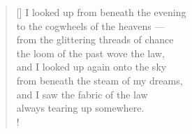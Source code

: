 \documentclass[a4paper,12pt,twoside,final]{book}
\begin{document}

\settowidth{\versewidth}{from under the steam of my dreams,}

\begin{verse}[\versewidth]
  I looked up from beneath the evening \\
  to the cogwheels of the heavens --- \\
  from the glittering threads of chance \\
  the loom of the past wove the law, \\
  and I looked up again onto the sky \\
  from beneath the steam of my dreams, \\
  and I saw the fabric of the law \\
  always tearing up somewhere. \\!
\end{verse}


\newpage

\settowidth{\versewidth}{törvényt szőtt a mult szövőszéke}
\end{document}

